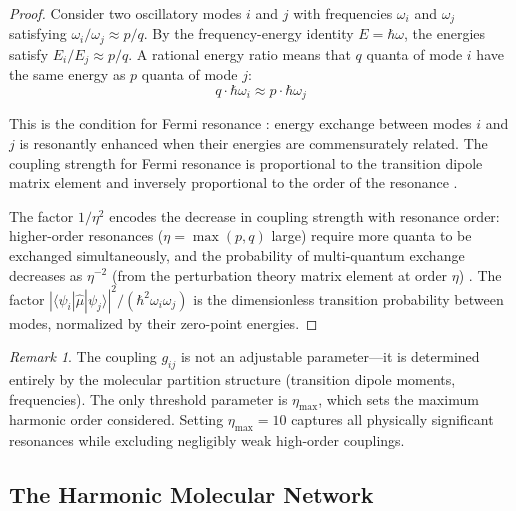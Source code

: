 \documentclass[11pt,a4paper]{article}
\theoremstyle{definition}
\theoremstyle{remark}
\newtheorem{remark}[theorem]{Remark}
\newcommand{\etamax}{\eta_{\mathrm{max}}}
\begin{document}
\begin{proof}
Consider two oscillatory modes $i$ and $j$ with frequencies $\omega_i$ and $\omega_j$ satisfying $\omega_i/\omega_j \approx p/q$. By the frequency-energy identity $E = \hbar\omega$, the energies satisfy $E_i/E_j \approx p/q$. A rational energy ratio means that $q$ quanta of mode $i$ have the same energy as $p$ quanta of mode $j$:
\begin{equation}
q \cdot \hbar\omega_i \approx p \cdot \hbar\omega_j
\label{eq:resonance_condition}
\end{equation}

This is the condition for Fermi resonance \citep{fermi1931}: energy exchange between modes $i$ and $j$ is resonantly enhanced when their energies are commensurately related. The coupling strength for Fermi resonance is proportional to the transition dipole matrix element and inversely proportional to the order of the resonance \citep{herzberg1945, wilson1955}.

The factor $1/\eta^2$ encodes the decrease in coupling strength with resonance order: higher-order resonances ($\eta = \max(p,q)$ large) require more quanta to be exchanged simultaneously, and the probability of multi-quantum exchange decreases as $\eta^{-2}$ (from the perturbation theory matrix element at order $\eta$) \citep{landau1977}. The factor $|\langle \psi_i|\hat{\mu}|\psi_j\rangle|^2/(\hbar^2\omega_i\omega_j)$ is the dimensionless transition probability between modes, normalized by their zero-point energies.
\end{proof}

\begin{remark}
The coupling $g_{ij}$ is not an adjustable parameter---it is determined entirely by the molecular partition structure (transition dipole moments, frequencies). The only threshold parameter is $\etamax$, which sets the maximum harmonic order considered. Setting $\etamax = 10$ captures all physically significant resonances while excluding negligibly weak high-order couplings.
\end{remark}

\subsection{The Harmonic Molecular Network}
\end{document}
